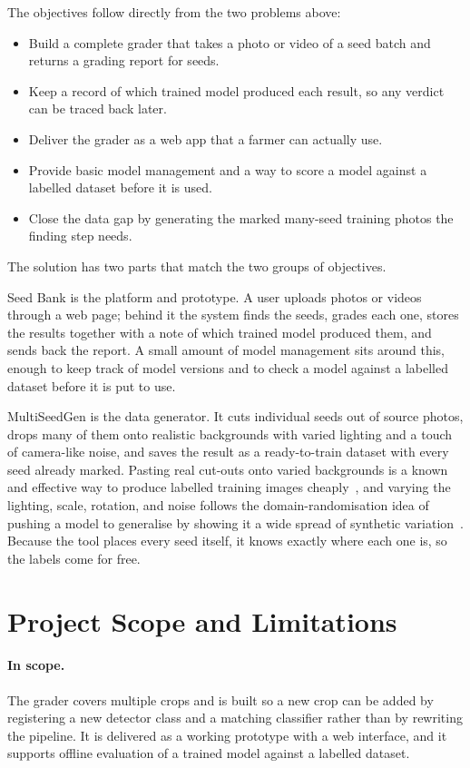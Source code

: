 The objectives follow directly from the two problems above:

\begin{itemize}
  \item Build a complete grader that takes a photo or video of a seed batch and returns a
        grading report for seeds.
  \item Keep a record of which trained model produced each result, so any verdict
        can be traced back later.
  \item Deliver the grader as a web app that a farmer can actually use.
  \item Provide basic model management and a way to score a model against a labelled
        dataset before it is used.
  \item Close the data gap by generating the marked many-seed training photos the
        finding step needs.
\end{itemize}

The solution has two parts that match the two groups of objectives.

Seed Bank is the platform and prototype. A user uploads photos or videos through a web page;
behind it the system finds the seeds, grades each one, stores the results together
with a note of which trained model produced them, and sends back the report. A small
amount of model management sits around this, enough to keep track of model versions
and to check a model against a labelled dataset before it is put to use.

MultiSeedGen is the data generator. It cuts individual seeds out of source photos,
drops many of them onto realistic backgrounds with varied lighting and a touch of
camera-like noise, and saves the result as a ready-to-train dataset with every seed
already marked. Pasting real cut-outs onto varied backgrounds is a known and
effective way to produce labelled training images cheaply~\cite{dwibedi2017cutpaste},
and varying the lighting, scale, rotation, and noise follows the domain-randomisation
idea of pushing a model to generalise by showing it a wide spread of synthetic
variation~\cite{tobin2017domainrand}. Because the tool places every seed itself, it
knows exactly where each one is, so the labels come for free.

\section{Project Scope and Limitations}

\paragraph{In scope.} The grader covers multiple crops and is built so
a new crop can be added by registering a new detector class and a matching classifier
rather than by rewriting the pipeline. It is delivered as a working prototype with a
web interface, and it supports offline evaluation of a trained model against a
labelled dataset.

